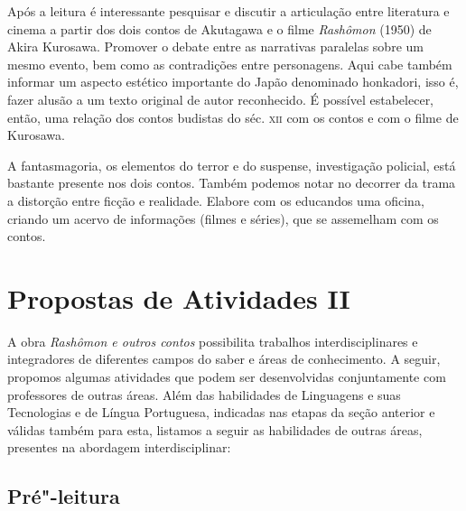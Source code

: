 \documentclass[12pt]{extarticle}
\begin{document}

Após a leitura é interessante pesquisar e discutir a articulação entre
literatura e cinema a partir dos dois contos de Akutagawa e o filme
\emph{Rashômon} (1950) de Akira Kurosawa. Promover o debate entre as narrativas
paralelas sobre um mesmo evento, bem como as contradições entre personagens.
Aqui cabe também informar um aspecto estético importante do Japão denominado
honkadori, isso é, fazer alusão a um texto original de autor reconhecido. É
possível estabelecer, então, uma relação dos contos budistas do séc.
\textsc{xii} com os contos e com o filme de Kurosawa.


A fantasmagoria, os elementos do terror e do suspense, investigação policial,
está bastante presente nos dois contos. Também podemos notar no decorrer da
trama a distorção entre ficção e realidade. Elabore com os educandos uma
oficina, criando um acervo de informações (filmes e séries), que se assemelham
com os contos.



\section{Propostas de Atividades II}

A obra \emph{Rashômon e outros contos} possibilita trabalhos interdisciplinares
e integradores de diferentes campos do saber e áreas de conhecimento. A seguir,
propomos algumas atividades que podem ser desenvolvidas conjuntamente com
professores de outras áreas. Além das habilidades de Linguagens e suas
Tecnologias e de Língua Portuguesa, indicadas nas etapas da seção anterior e
válidas também para esta, listamos a seguir as habilidades de outras áreas,
presentes na abordagem interdisciplinar:



\subsection{Pré"-leitura}
\end{document}
